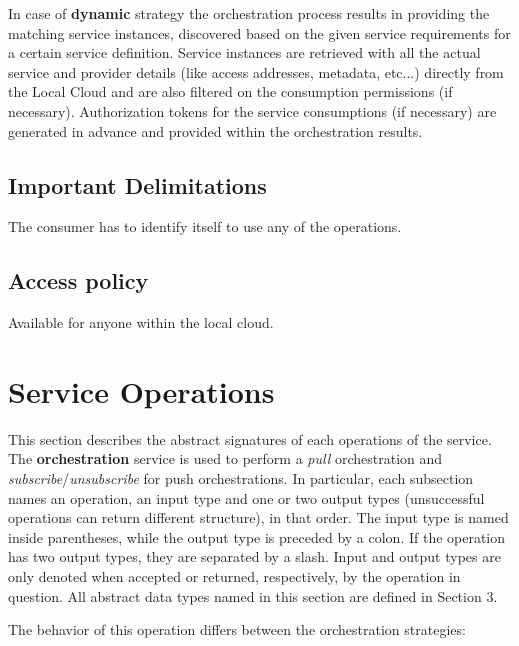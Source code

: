 \documentclass[a4paper]{arrowhead}
\begin{document}
In case of \textbf{dynamic} strategy the orchestration process results in providing the matching service instances, discovered based on the given service requirements for a certain service definition. Service instances are retrieved with all the actual service and provider details (like access addresses, metadata, etc...) directly from the Local Cloud and are also filtered on the consumption permissions (if necessary). Authorization tokens for the service consumptions (if necessary) are generated in advance and provided within the orchestration results. 

\subsection{Important Delimitations}
\label{sec:delimitations}

The consumer has to identify itself to use any of the operations.

\subsection{Access policy}
\label{sec:accesspolicy}

Available for anyone within the local cloud.

\newpage

\section{Service Operations}
\label{sec:functions}

This section describes the abstract signatures of each operations of the service. The \textbf{orchestration} service is used to perform a \textit{pull} orchestration and  \textit{subscribe}/\textit{unsubscribe} for push orchestrations.
In particular, each subsection names an operation, an input type and one or two output types (unsuccessful operations can return different structure), in that order.
The input type is named inside parentheses, while the output type is preceded by a colon. If the operation has two output types, they are separated by a slash.
Input and output types are only denoted when accepted or returned, respectively, by the operation in question. All abstract data types named in this section are defined in Section 3.

{}

The behavior of this operation differs between the orchestration strategies:
\end{document}
